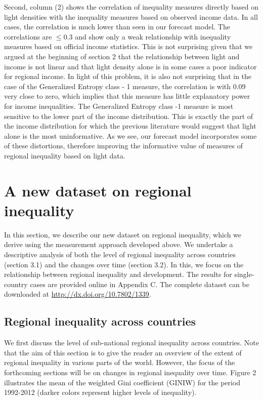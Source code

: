\documentclass[10pt]{article}
\begin{document}
Second, column (2) shows the correlation of inequality measures directly based on light densities with the inequality measures based on observed income data. In all cases, the correlation is much lower than seen in our forecast model. The correlations are $\leq 0.3$ and show only a weak relationship with inequality measures based on official income statistics. This is not surprising given that we argued at the beginning of section 2 that the relationship between light and income is not linear and that light density alone is in some cases a poor indicator for regional income. In light of this problem, it is also not surprising that in the case of the Generalized Entropy class - 1 measure, the correlation is with 0.09 very close to zero, which implies that this measure has little explanatory power for income inequalities. The Generalized Entropy class -1 measure is most sensitive to the lower part of the income distribution. This is exactly the part of the income distribution for which the previous literature would suggest that light alone is the most uninformative. As we see, our forecast model incorporates some of these distortions, therefore improving the informative value of measures of regional inequality based on light data.

\section{A new dataset on regional inequality}
In this section, we describe our new dataset on regional inequality, which we derive using the measurement approach developed above. We undertake a descriptive analysis of both the level of regional inequality across countries (section 3.1) and the changes over time (section 3.2). In this, we focus on the relationship between regional inequality and development. The results for single-country cases are provided online in Appendix C. The complete dataset can be downloaded at \href{http://dx.doi.org/10.7802/1339}{http://dx.doi.org/10.7802/1339}.

\subsection{Regional inequality across countries}
We first discuss the level of sub-national regional inequality across countries. Note that the aim of this section is to give the reader an overview of the extent of regional inequality in various parts of the world. However, the focus of the forthcoming sections will be on changes in regional inequality over time. Figure 2 illustrates the mean of the weighted Gini coefficient (GINIW) for the period 1992-2012 (darker colors represent higher levels of inequality).
\end{document}
